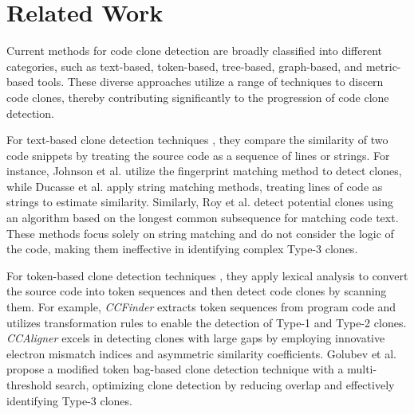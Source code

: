 \section{Related Work}
Current methods for code clone detection are broadly classified into different categories, such as text-based, token-based, tree-based, graph-based, and metric-based tools. 
 These diverse approaches utilize a range of techniques to discern code clones, thereby contributing significantly to the progression of code clone detection.

For text-based clone detection techniques \cite{johnson1994substring, ducasse1999language, roy2008nicad, ragkh2017using, kim2018software, jadon2016code, yu2017detecting, kim2017vuddy}, they compare the similarity of two code snippets by treating the source code as a sequence of lines or strings. 
For instance, Johnson et al. \cite{johnson1994substring} utilize the fingerprint matching method to detect clones, while Ducasse et al. \cite{ducasse1999language} apply string matching methods, treating lines of code as strings to estimate similarity. 
Similarly, Roy et al. \cite{roy2008nicad} detect potential clones using an algorithm based on the longest common subsequence for matching code text. 
These methods focus solely on string matching and do not consider the logic of the code, making them ineffective in identifying complex Type-3 clones.

For token-based clone detection techniques \cite{gode2009incremental, kamiya2002ccfinder, sajnani2016sourcerercc, li2017cclearner, wang2018ccaligner, golubev2021multi, hung2020cppcd}, they apply lexical analysis to convert the source code into token sequences and then detect code clones by scanning them. 
For example, \emph{CCFinder} \cite{kamiya2002ccfinder} extracts token sequences from program code and utilizes transformation rules to enable the detection of Type-1 and Type-2 clones. 
\emph{CCAligner} \cite{wang2018ccaligner} excels in detecting clones with large gaps by employing innovative electron mismatch indices and asymmetric similarity coefficients. 
Golubev et al. \cite{golubev2021multi} propose a modified token bag-based clone detection technique with a multi-threshold search, optimizing clone detection by reducing overlap and effectively identifying Type-3 clones. 

